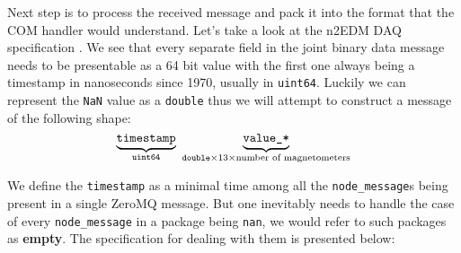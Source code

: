 Next step is to process the received message and pack it into the format that the COM handler would understand. Let's take a look at the n2EDM DAQ specification \cite{Bison2018}. We see that every separate field in the joint binary data message needs to be presentable as a 64 bit value with the first one always being a timestamp in nanoseconds since 1970, usually in \texttt{uint64}. Luckily we can \cite{WorkingGroupforFloating-PointArithmetic1985} represent the \texttt{NaN} value as a \texttt{double} thus we will attempt to construct a message of the following shape:
\[
\underbrace{\texttt{timestamp}}_{\texttt{uint64}}
\ 
\underbrace{\vphantom{\texttt{timestamp}} \texttt{value\_*}}_{\texttt{double} \times 13 \times \text{number of magnetometers}}
\]

We define the \texttt{timestamp} as a minimal time among all the \texttt{node\_message}s being present in a single ZeroMQ message. But one inevitably needs to handle the case of every \texttt{node\_message} in a package being \texttt{nan}, we would refer to such packages as \textbf{empty}. The specification for dealing with them is presented below:

